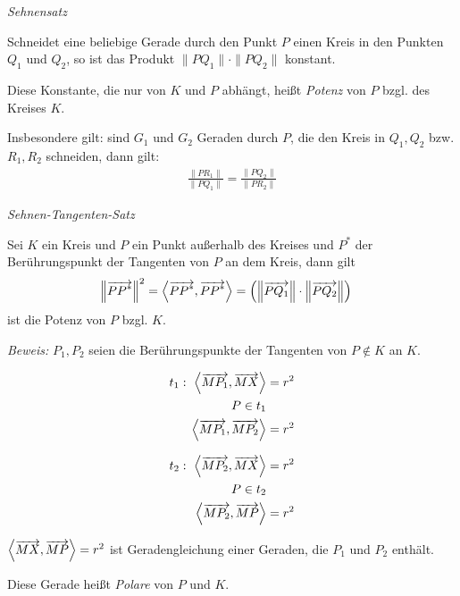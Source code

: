 \begin{mysatz}\textit{Sehnensatz}\medskip

    Schneidet eine beliebige Gerade durch den Punkt $P$ einen Kreis in den Punkten $Q_1$ und $Q_2$, so ist das Produkt $\| P Q_1 \| \cdot \| P Q_2 \|$ konstant.

    Diese Konstante, die nur von $K$ und $P$ abhängt, heißt \textit{Potenz} von $P$ bzgl. des Kreises $K$.

    Insbesondere gilt: sind $G_1$ und $G_2$ Geraden durch $P$, die den Kreis in $Q_1, Q_2$ bzw. $R_1, R_2$ schneiden, dann gilt:
    \begin{align*}
        \frac{\| P R_1 \|}{\| P Q_1 \|} = \frac{\| P Q_2 \|}{\| P R_2 \|}
    \end{align*}
\end{mysatz}

\begin{mysatz}\textit{Sehnen-Tangenten-Satz}\medskip

    Sei $K$ ein Kreis und $P$ ein Punkt außerhalb des Kreises und $P^{*}$ der Berührungspunkt der Tangenten von $P$ an dem Kreis, dann gilt
    \begin{align*}
        \left\| \overrightarrow{PP^{*}} \right\|^{2} & = \left\langle \overrightarrow{PP^{*}}, \overrightarrow{PP^{*}} \right\rangle = \left( \left\| \overrightarrow{PQ_{1}} \right\| \cdot \left\| \overrightarrow{PQ_{2}} \right\| \right)
    \end{align*}
    ist die Potenz von $P$ bzgl. $K$.\medskip

    \textit{Beweis:} $P_{1}, P_{2}$ seien die Berührungspunkte der Tangenten von $P \notin K$ an $K$.

    \begin{minipage}{0.4\textwidth}
        \begin{align*}
            t_1: \ \left\langle \overrightarrow{MP_{1}}, \overrightarrow{MX} \right\rangle & = r^2\\
            P \in t_{1} & \\
            \left\langle \overrightarrow{MP_{1}}, \overrightarrow{MP_{2}} \right\rangle & = r^2\\
        \end{align*}
    \end{minipage}
    \begin{minipage}{0.4\textwidth}
        \begin{align*}
            t_2: \ \left\langle \overrightarrow{MP_{2}}, \overrightarrow{MX} \right\rangle & = r^2\\
            P \in t_{2} & \\
            \left\langle \overrightarrow{MP_{2}}, \overrightarrow{MP} \right\rangle & = r^2\\
        \end{align*}
    \end{minipage}

    $\left\langle \overrightarrow{MX}, \overrightarrow{MP} \right\rangle = r^2$ ist Geradengleichung einer Geraden, die $P_{1}$ und $P_{2}$ enthält.

    Diese Gerade heißt \textit{Polare} von $P$ und $K$.
\end{mysatz}

